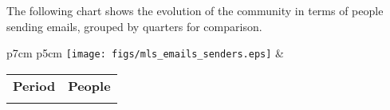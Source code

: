 The following chart shows the evolution of the community in terms of people sending emails, grouped by quarters for comparison. 

\begin{tabular}{p{7cm} p{5cm}}
    \vspace{0pt} 
    \texttt{[image: figs/mls\_emails\_senders.eps]}
    & 
    \vspace{0pt}
    \begin{tabular}{l|l}%
    \bfseries Period & \bfseries People %
    \csvreader[head to column names]{data/mls_emails_senders.csv}{}%
    {\\ & \emailssenders}
    \end{tabular}
\end{tabular}